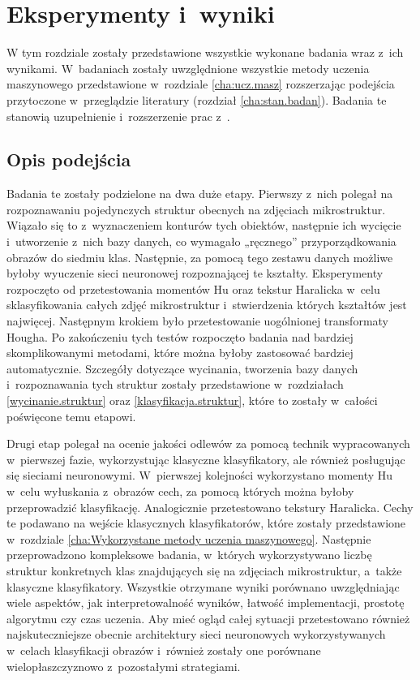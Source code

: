 \chapter{Eksperymenty i~wyniki}
\label{cha5}

W tym rozdziale zostały przedstawione wszystkie wykonane badania wraz z~ich wynikami. W~badaniach zostały uwzględnione wszystkie metody uczenia maszynowego przedstawione w~rozdziale \ref{cha:ucz.masz} rozszerzając podejścia przytoczone w~przeglądzie literatury (rozdział \ref{cha:stan.badan}). Badania te stanowią uzupełnienie i~rozszerzenie prac z~\cite{Reczek21}. 

\section{Opis podejścia}
\label{opis_podejścia}
Badania te zostały podzielone na dwa duże etapy. Pierwszy z~nich polegał na rozpoznawaniu pojedynczych struktur obecnych na zdjęciach mikrostruktur. Wiązało się to z~wyznaczeniem konturów tych obiektów, następnie ich wycięcie i~utworzenie z~nich bazy danych, co wymagało „ręcznego” przyporządkowania obrazów do siedmiu klas. Następnie, za pomocą tego zestawu danych możliwe byłoby wyuczenie sieci neuronowej rozpoznającej te kształty. Eksperymenty rozpoczęto od przetestowania momentów Hu oraz tekstur Haralicka w~celu sklasyfikowania całych zdjęć mikrostruktur i~stwierdzenia których kształtów jest najwięcej. Następnym krokiem było przetestowanie uogólnionej transformaty Hougha. Po zakończeniu tych testów rozpoczęto badania nad bardziej skomplikowanymi metodami, które można byłoby zastosować bardziej automatycznie. Szczegóły dotyczące wycinania, tworzenia bazy danych i~rozpoznawania tych struktur zostały przedstawione w~rozdziałach \ref{wycinanie.struktur} oraz \ref{klasyfikacja.struktur}, które to zostały w~całości poświęcone temu etapowi.

Drugi etap polegał na ocenie jakości odlewów za pomocą technik wypracowanych w~pierwszej fazie, wykorzystując klasyczne klasyfikatory, ale również posługując się sieciami neuronowymi. W~pierwszej kolejności wykorzystano momenty Hu w~celu wyłuskania z~obrazów cech, za pomocą których można byłoby przeprowadzić klasyfikację. Analogicznie przetestowano tekstury Haralicka. Cechy te podawano na wejście klasycznych klasyfikatorów, które zostały przedstawione w~rozdziale \ref{cha:Wykorzystane metody uczenia maszynowego}. Następnie przeprowadzono kompleksowe badania, w~których wykorzystywano liczbę struktur konkretnych klas znajdujących się na zdjęciach mikrostruktur, a~także klasyczne klasyfikatory. Wszystkie otrzymane wyniki porównano uwzględniając wiele aspektów, jak interpretowalność wyników, łatwość implementacji, prostotę algorytmu czy czas uczenia. Aby mieć ogląd całej sytuacji przetestowano również najskuteczniejsze obecnie architektury sieci neuronowych wykorzystywanych w~celach klasyfikacji obrazów i~również zostały one porównane wielopłaszczyznowo z~pozostałymi strategiami.

